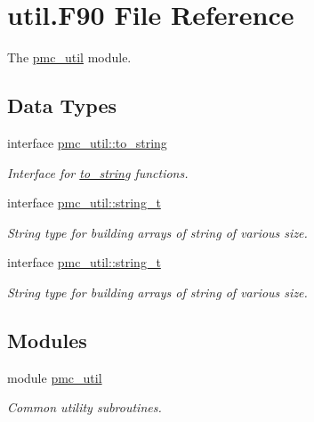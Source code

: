 \hypertarget{util_8_f90}{}\section{util.\+F90 File Reference}
\label{util_8_f90}


The \mbox{\hyperlink{namespacepmc__util}{pmc\+\_\+util}} module.  


\subsection*{Data Types}
\begin{DoxyCompactItemize}
\item 
interface \mbox{\hyperlink{interfacepmc__util_1_1to__string}{pmc\+\_\+util\+::to\+\_\+string}}
\begin{DoxyCompactList}\small\item\em Interface for \mbox{\hyperlink{interfacepmc__util_1_1to__string}{to\+\_\+string}} functions. \end{DoxyCompactList}\item 
interface \mbox{\hyperlink{structpmc__util_1_1string__t}{pmc\+\_\+util\+::string\+\_\+t}}
\begin{DoxyCompactList}\small\item\em String type for building arrays of string of various size. \end{DoxyCompactList}\item 
interface \mbox{\hyperlink{structpmc__util_1_1string__t}{pmc\+\_\+util\+::string\+\_\+t}}
\begin{DoxyCompactList}\small\item\em String type for building arrays of string of various size. \end{DoxyCompactList}\end{DoxyCompactItemize}
\subsection*{Modules}
\begin{DoxyCompactItemize}
\item 
module \mbox{\hyperlink{namespacepmc__util}{pmc\+\_\+util}}
\begin{DoxyCompactList}\small\item\em Common utility subroutines. \end{DoxyCompactList}\end{DoxyCompactItemize}
